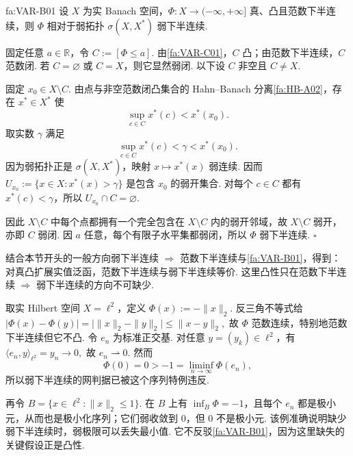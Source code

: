 \begin{FATheorem}[B][凸的范数下半连续蕴含弱下半连续]{fa:VAR-B01}
设 \(\displaystyle X\) 为实 Banach 空间，\(\displaystyle\Phi:X\to(-\infty,+\infty]\) 真、凸且范数下半连续，则 \(\displaystyle\Phi\) 相对于弱拓扑 \(\displaystyle\sigma(X,X^*)\) 弱下半连续.
\end{FATheorem}

\begin{FAProof}
固定任意 \(\displaystyle a\in\mathbb R\)，令
\(\displaystyle C:=[\Phi\leqslant a].\)
由\autoref{fa:VAR-C01}，\(\displaystyle C\) 凸；由范数下半连续，\(\displaystyle C\) 范数闭. 若 \(\displaystyle C=\varnothing\) 或 \(\displaystyle C=X\)，则它显然弱闭. 以下设 \(\displaystyle C\) 非空且 \(\displaystyle C\neq X\).

固定 \(\displaystyle x_0\in X\setminus C\). 由点与非空范数闭凸集合的 Hahn--Banach 分离\autoref{fa:HB-A02}，存在 \(\displaystyle x^*\in X^*\) 使
\[
\sup_{c\in C}x^*(c)
<
x^*(x_0).
\]
取实数 \(\displaystyle\gamma\) 满足
\[
\sup_{c\in C}x^*(c)
<
\gamma
<
x^*(x_0).
\]
因为弱拓扑正是 \(\displaystyle\sigma(X,X^*)\)，映射 \(\displaystyle x\mapsto x^*(x)\) 弱连续. 因而
\(\displaystyle U_{x_0} := \{x\in X:x^*(x)>\gamma\}\)
是包含 \(\displaystyle x_0\) 的弱开集合. 对每个 \(\displaystyle c\in C\) 都有 \(\displaystyle x^*(c)<\gamma\)，所以 \(\displaystyle U_{x_0}\cap C=\varnothing\).

因此 \(\displaystyle X\setminus C\) 中每个点都拥有一个完全包含在 \(\displaystyle X\setminus C\) 内的弱开邻域，故 \(\displaystyle X\setminus C\) 弱开，亦即 \(\displaystyle C\) 弱闭. 因 \(\displaystyle a\) 任意，每个有限子水平集都弱闭，所以 \(\displaystyle\Phi\) 弱下半连续.
\hfill\(\square\)

\end{FAProof}

结合本节开头的一般方向弱下半连续 \(\displaystyle\Longrightarrow\) 范数下半连续与\autoref{fa:VAR-B01}，得到：对真凸扩展实值泛函，范数下半连续与弱下半连续等价. 这里凸性只在范数下半连续 \(\displaystyle\Longrightarrow\) 弱下半连续的方向不可缺少.

\begin{FACounterexample}[范数连续不推出弱下半连续]
取实 Hilbert 空间 \(\displaystyle X=\ell^2\)，定义
\(\displaystyle \Phi(x):=-\|x\|_2.\)
反三角不等式给
\(\displaystyle |\Phi(x)-\Phi(y)| = \bigl|\|x\|_2-\|y\|_2\bigr| \leqslant \|x-y\|_2,\)
故 \(\displaystyle\Phi\) 范数连续，特别地范数下半连续但它不凸. 令 \(\displaystyle e_n\) 为标准正交基. 对任意 \(\displaystyle y=(y_k)\in\ell^2\)，有
\(\displaystyle \langle e_n,y\rangle_{\ell^2} =y_n \longrightarrow0,\)
故 \(\displaystyle e_n\rightharpoonup0\). 然而
\[
\Phi(0)=0
>
-1
=
\liminf_{n\to\infty}\Phi(e_n),
\]
所以弱下半连续的网判据已被这个序列特例违反.

再令 \(\displaystyle B=\{x\in\ell^2:\|x\|_2\leqslant1\}\). 在 \(\displaystyle B\) 上有 \(\displaystyle\inf_B\Phi=-1\)，且每个 \(\displaystyle e_n\) 都是极小元，从而也是极小化序列；它们弱收敛到 \(\displaystyle0\)，但 \(\displaystyle0\) 不是极小元. 该例准确说明缺少弱下半连续时，弱极限可以丢失最小值. 它不反驳\autoref{fa:VAR-B01}，因为这里缺失的关键假设正是凸性.
\end{FACounterexample}

